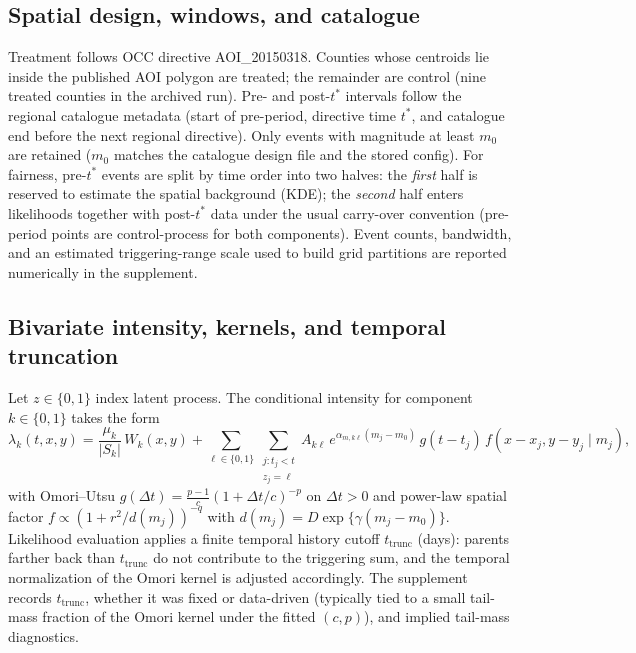 \documentclass{statsoc}
\newcommand{\1}{\mathbbm{1}}
\begin{document}
\subsection{Spatial design, windows, and catalogue}\label{sec:ok_design}
Treatment follows OCC directive AOI\_20150318. Counties whose centroids lie inside the published AOI polygon are treated; the remainder are control (nine treated counties in the archived run). Pre- and post-$t^\ast$ intervals follow the regional catalogue metadata (start of pre-period, directive time $t^\ast$, and catalogue end before the next regional directive). Only events with magnitude at least $m_0$ are retained ($m_0$ matches the catalogue design file and the stored config). For fairness, pre-$t^\ast$ events are split by time order into two halves: the \emph{first} half is reserved to estimate the spatial background (KDE); the \emph{second} half enters likelihoods together with post-$t^\ast$ data under the usual carry-over convention (pre-period points are control-process for both components). Event counts, bandwidth, and an estimated triggering-range scale used to build grid partitions are reported numerically in the supplement.

\subsection{Bivariate intensity, kernels, and temporal truncation}\label{sec:ok_etas_spec}
Let $z\in\{0,1\}$ index latent process. The conditional intensity for component $k\in\{0,1\}$ takes the form
\[
\lambda_k(t,x,y)
  = \frac{\mu_k}{|S_k|}\, W_k(x,y)
  + \sum_{\ell \in \{0,1\}} \sum_{\substack{j : t_j < t \\ z_j = \ell}}
    A_{k\ell}\, e^{\alpha_{m,k\ell}(m_j - m_0)}\,
    g(t - t_j)\, f(x-x_j, y-y_j \mid m_j),
\]
with Omori--Utsu $g(\Delta t)=\frac{p-1}{c}(1+\Delta t/c)^{-p}$ on $\Delta t>0$ and power-law spatial factor $f \propto (1+r^2/d(m_j))^{-q}$ with $d(m_j)=D\exp\{\gamma(m_j-m_0)\}$. Likelihood evaluation applies a finite temporal history cutoff $t_{\mathrm{trunc}}$ (days): parents farther back than $t_{\mathrm{trunc}}$ do not contribute to the triggering sum, and the temporal normalization of the Omori kernel is adjusted accordingly. The supplement records $t_{\mathrm{trunc}}$, whether it was fixed or data-driven (typically tied to a small tail-mass fraction of the Omori kernel under the fitted $(c,p)$), and implied tail-mass diagnostics.
\end{document}
